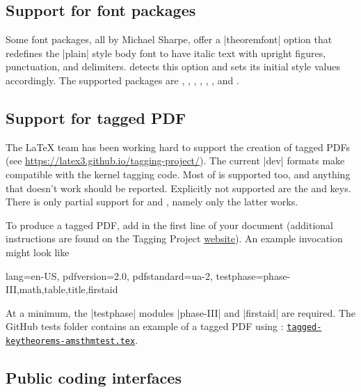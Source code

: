 \documentclass{ltxdoc}
\begin{document}
\subsection{Support for font packages}

Some font packages, all by Michael Sharpe, offer a |theoremfont| option that redefines the |plain| style body font to have italic text with upright figures, punctuation, and delimiters.  detects this option and sets its initial style values accordingly. The supported packages are , , , , , , and .

\subsection{Support for tagged PDF}

The \LaTeX{} team has been working hard to support the creation of tagged PDFs (see \url{https://latex3.github.io/tagging-project/}).
The current |dev| formats make  compatible with the kernel tagging code.
Most of  is supported too, and anything that doesn't work should be reported.
Explicitly not supported are the  and  keys.
There is only partial support for  and , namely only the latter works.

To produce a tagged PDF, add  in the first line of your document (additional instructions are found on the Tagging Project \href{https://latex3.github.io/tagging-project/documentation/prototype-usage-instructions.html}{website}).
An example invocation might look like

\begin{dispListing}
\DocumentMetadata
  {
    lang=en-US,
    pdfversion=2.0,
    pdfstandard=ua-2,
    testphase={phase-III,math,table,title,firstaid}
  }
\end{dispListing}

At a minimum, the |testphase| modules |phase-III| and |firstaid| are required.
The GitHub tests folder contains an example of a tagged PDF using : \href{https://github.com/mbertucci47/keytheorems/blob/develop/tests/tagged-keytheorems-amsthmtest.tex}{\texttt{tagged-keytheorems-amsthmtest.tex}}.

\subsection{Public coding interfaces}
\end{document}

